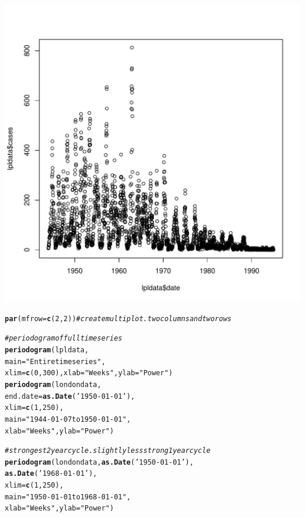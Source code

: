 \documentclass[12pt]{article}\usepackage[]{graphicx}\usepackage[]{color}
\makeatletter
\def\maxwidth{ %
  \ifdim\Gin@nat@width>\linewidth
    \linewidth
  \else
    \Gin@nat@width
  \fi
}
\newcommand{\hlnum}[1]{\textcolor[rgb]{0.686,0.059,0.569}{#1}}%
\newcommand{\hlstr}[1]{\textcolor[rgb]{0.192,0.494,0.8}{#1}}%
\newcommand{\hlcom}[1]{\textcolor[rgb]{0.678,0.584,0.686}{\textit{#1}}}%
\newcommand{\hlstd}[1]{\textcolor[rgb]{0.345,0.345,0.345}{#1}}%
\newcommand{\hlkwc}[1]{\textcolor[rgb]{0.333,0.667,0.333}{#1}}%
\newcommand{\hlkwd}[1]{\textcolor[rgb]{0.737,0.353,0.396}{\textbf{#1}}}%
\newenvironment{kframe}{%
 \def\at@end@of@kframe{}%
 \ifinner\ifhmode%
  \def\at@end@of@kframe{\end{minipage}}%
  \begin{minipage}{\columnwidth}%
 \fi\fi%
 \def\FrameCommand##1{\hskip\@totalleftmargin \hskip-\fboxsep
 \colorbox{shadecolor}{##1}\hskip-\fboxsep
     \hskip-\linewidth \hskip-\@totalleftmargin \hskip\columnwidth}%
 \MakeFramed {\advance\hsize-\width
   \@totalleftmargin\z@ \linewidth\hsize
   \@setminipage}}%
 {\par\unskip\endMakeFramed%
 \at@end@of@kframe}
\newenvironment{knitrout}{}{} %
\makeatother
\begin{document}
\begin{enumerate}[(a)]
\begin{knitrout}
\includegraphics[width=\maxwidth]{figure/unnamed-chunk-5-1} 
\begin{kframe}\begin{alltt}
\hlkwd{par}\hlstd{(}\hlkwc{mfrow}\hlstd{=}\hlkwd{c}\hlstd{(}\hlnum{2}\hlstd{,}\hlnum{2}\hlstd{))} \hlcom{#create multiplot. two columns and two rows}

\hlcom{#periodogram of full time series}
\hlkwd{periodogram}\hlstd{(lpldata,}
            \hlkwc{main}\hlstd{=}\hlstr{"Entire timeseries"}\hlstd{,}
            \hlkwc{xlim}\hlstd{=}\hlkwd{c}\hlstd{(}\hlnum{0}\hlstd{,}\hlnum{300}\hlstd{),}\hlkwc{xlab}\hlstd{=}\hlstr{"Weeks"}\hlstd{,} \hlkwc{ylab}\hlstd{=}\hlstr{"Power"}\hlstd{)}
\hlkwd{periodogram}\hlstd{(londondata,}
            \hlkwc{end.date}\hlstd{=}\hlkwd{as.Date}\hlstd{(}\hlstr{'1950-01-01'}\hlstd{),}
            \hlkwc{xlim}\hlstd{=}\hlkwd{c}\hlstd{(}\hlnum{1}\hlstd{,}\hlnum{250}\hlstd{),}
            \hlkwc{main}\hlstd{=}\hlstr{"1944-01-07 to 1950-01-01"}\hlstd{,}
            \hlkwc{xlab}\hlstd{=}\hlstr{"Weeks"}\hlstd{,} \hlkwc{ylab}\hlstd{=}\hlstr{"Power"}\hlstd{)}

\hlcom{#strongest 2 year cycle. slightly less strong 1 year cycle}
\hlkwd{periodogram}\hlstd{(londondata,}\hlkwd{as.Date}\hlstd{(}\hlstr{'1950-01-01'}\hlstd{),}
            \hlkwd{as.Date}\hlstd{(}\hlstr{'1968-01-01'}\hlstd{),}
            \hlkwc{xlim}\hlstd{=}\hlkwd{c}\hlstd{(}\hlnum{1}\hlstd{,}\hlnum{250}\hlstd{),}
            \hlkwc{main}\hlstd{=}\hlstr{"1950-01-01 to 1968-01-01"}\hlstd{,}
            \hlkwc{xlab}\hlstd{=}\hlstr{"Weeks"}\hlstd{,} \hlkwc{ylab}\hlstd{=}\hlstr{"Power"}\hlstd{)}


\end{alltt}
\end{kframe}
\end{knitrout}
\end{enumerate}
\end{document}
